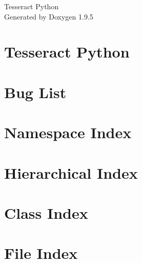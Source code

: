 \documentclass[twoside]{book}
\newcommand{\+}{\discretionary{\mbox{\scriptsize$\hookleftarrow$}}{}{}}
\newcommand{\clearemptydoublepage}{%
    \newpage{\pagestyle{empty}\cleardoublepage}%
  }
\begin{document}
  \raggedbottom
    \hypersetup{pageanchor=false,
                bookmarksnumbered=true,
                pdfencoding=unicode
               }
  \begin{titlepage}
  \vspace*{7cm}
  \begin{center}%
  {\Large Tesseract Python}\\
  \vspace*{1cm}
  {\large Generated by Doxygen 1.9.5}\\
  \end{center}
  \end{titlepage}
  \clearemptydoublepage
  \tableofcontents
  \clearemptydoublepage
  \hypersetup{pageanchor=true}
\chapter{Tesseract Python}
\label{index}\hypertarget{index}{}
\chapter{Bug List}
\label{bug}

\chapter{Namespace Index}

\chapter{Hierarchical Index}

\chapter{Class Index}

\chapter{File Index}

\end{document}

